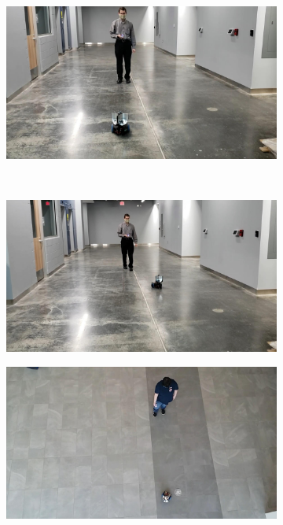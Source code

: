 \documentclass[conference]{IEEEtran}
\begin{document}
\begin{figure}[htbp]
\begin{subfigure}[b]{0.30\linewidth}
   \centering
   \includegraphics[width=\textwidth]{videos/frames/211.jpeg} 
   \caption{}
   \label{fig:211}
 \end{subfigure}
 \\
  \begin{subfigure}[b]{0.30\linewidth}
    \centering
    \includegraphics[width=\textwidth]{videos/frames/351.jpeg} 
    \caption{}
    \label{fig:351}
  \end{subfigure}
  \begin{subfigure}[b]{0.30\linewidth}
    \centering
    \includegraphics[width=\textwidth]{videos/frames/491.jpeg} 

\end{subfigure}
\end{figure}
\end{document}
